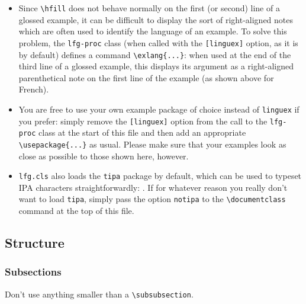 \documentclass[linguex]{lfg-proc}
\begin{document}
\begin{itemize}
  \item Since \verb=\hfill= does not behave normally on the first (or second)
        line of a glossed example, it can be difficult to display the sort of
        right-aligned notes which are often used to identify the language of an
        example. To solve this problem, the \verb=lfg-proc= class (when called
        with the \verb=[linguex]= option, as it is by default) defines a command
        \verb=\exlang{...}=: when used at the end of the third line of a glossed
        example, this displays its argument as a right-aligned parenthetical
        note on the first line of the example (as shown above for French).

  \item You are free to use your own example package of choice instead of
        \verb=linguex= if you prefer: simply remove the \verb=[linguex]= option
        from the call to the \verb=lfg-proc= class at the start of this file and
        then add an appropriate \verb=\usepackage{...}= as usual. Please make
        sure that your examples look as close as possible to those shown here,
        however.

  \item \verb=lfg.cls= also loads the \verb=tipa= package by default, which can
        be used to typeset IPA characters straightforwardly:
        . If for whatever reason you really don't want to
        load \verb=tipa=, simply pass the option \verb=notipa= to the
        \verb=\documentclass= command at the top of this file.

\end{itemize}


\subsection{Structure}

\subsubsection{Subsections}

Don't use anything smaller than a \verb=\subsubsection=.






\end{document}
